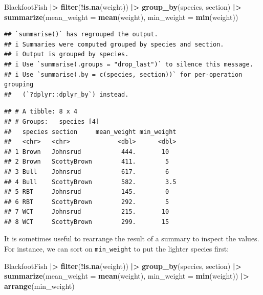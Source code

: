\documentclass[
  10pt,
  letterpaper,
  twoside,
  openright]{book}
\newenvironment{Shaded}{\begin{snugshade}}{\end{snugshade}}
\newcommand{\AttributeTok}[1]{\textcolor[rgb]{0.13,0.29,0.53}{#1}}
\newcommand{\FunctionTok}[1]{\textcolor[rgb]{0.13,0.29,0.53}{\textbf{#1}}}
\newcommand{\NormalTok}[1]{#1}
\newcommand{\SpecialCharTok}[1]{\textcolor[rgb]{0.81,0.36,0.00}{\textbf{#1}}}
\begin{document}
\begin{Shaded}
\begin{Highlighting}[]
\NormalTok{BlackfootFish }\SpecialCharTok{|\textgreater{}}
  \FunctionTok{filter}\NormalTok{(}\SpecialCharTok{!}\FunctionTok{is.na}\NormalTok{(weight)) }\SpecialCharTok{|\textgreater{}}
  \FunctionTok{group\_by}\NormalTok{(species, section) }\SpecialCharTok{|\textgreater{}}
  \FunctionTok{summarize}\NormalTok{(}\AttributeTok{mean\_weight =} \FunctionTok{mean}\NormalTok{(weight),}
            \AttributeTok{min\_weight =} \FunctionTok{min}\NormalTok{(weight))}
\end{Highlighting}
\end{Shaded}

\begin{verbatim}
## `summarise()` has regrouped the output.
## i Summaries were computed grouped by species and section.
## i Output is grouped by species.
## i Use `summarise(.groups = "drop_last")` to silence this message.
## i Use `summarise(.by = c(species, section))` for per-operation grouping
##   (`?dplyr::dplyr_by`) instead.
\end{verbatim}

\begin{verbatim}
## # A tibble: 8 x 4
## # Groups:   species [4]
##   species section     mean_weight min_weight
##   <chr>   <chr>             <dbl>      <dbl>
## 1 Brown   Johnsrud           444.       10  
## 2 Brown   ScottyBrown        411.        5  
## 3 Bull    Johnsrud           617.        6  
## 4 Bull    ScottyBrown        582.        3.5
## 5 RBT     Johnsrud           145.        0  
## 6 RBT     ScottyBrown        292.        5  
## 7 WCT     Johnsrud           215.       10  
## 8 WCT     ScottyBrown        299.       15
\end{verbatim}

It is sometimes useful to rearrange the result of a summary to inspect
the values. For instance, we can sort on \texttt{min\_weight} to put the
lighter species first:

\begin{Shaded}
\begin{Highlighting}[]
\NormalTok{BlackfootFish }\SpecialCharTok{|\textgreater{}}
  \FunctionTok{filter}\NormalTok{(}\SpecialCharTok{!}\FunctionTok{is.na}\NormalTok{(weight)) }\SpecialCharTok{|\textgreater{}}
  \FunctionTok{group\_by}\NormalTok{(species, section) }\SpecialCharTok{|\textgreater{}}
  \FunctionTok{summarize}\NormalTok{(}\AttributeTok{mean\_weight =} \FunctionTok{mean}\NormalTok{(weight),}
            \AttributeTok{min\_weight =} \FunctionTok{min}\NormalTok{(weight)) }\SpecialCharTok{|\textgreater{}}
  \FunctionTok{arrange}\NormalTok{(min\_weight)}
\end{Highlighting}
\end{Shaded}
\end{document}
